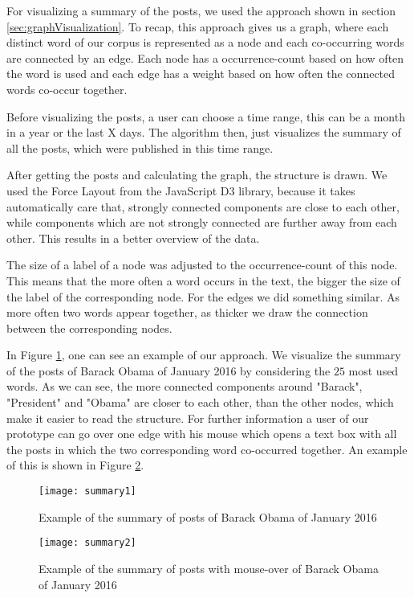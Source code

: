 For visualizing a summary of the posts, we used the approach shown in section \ref{sec:graphVisualization}. To recap, this approach gives us a graph, where each distinct word of our corpus is represented as a node and each co-occurring words are connected by an edge. Each node has a occurrence-count based on how often the word is used and each edge has a weight based on how often the connected words co-occur together.


Before visualizing the posts, a user can choose a time range, this can be a month in a year or the last X days. The algorithm then, just visualizes the summary of all the posts, which were published in this time range.


After getting the posts and calculating the graph, the structure is drawn. We used the Force Layout from the JavaScript D3 library, because it takes automatically care that, strongly connected components are close to each other, while components which are not strongly connected are further away from each other. This results in a better overview of the data. 


The size of a label of a node was adjusted to the occurrence-count of this node. This means that the more often a word occurs in the text, the bigger the size of the label of the corresponding node. For the edges we did something similar. As more often two words appear together, as thicker we draw the connection between the corresponding nodes.


In  Figure \ref{fig:summary}, one can see an example of our approach. We visualize the summary of the posts of Barack Obama of January 2016 by considering the $25$ most used words. As we can see, the more connected components around "Barack", "President" and "Obama" are closer to each other, than the other nodes, which make it easier to read the structure. For further information a user of our prototype can go over one edge with his mouse which opens a text box with all the posts in which the two corresponding word co-occurred together. An example of this is shown in Figure \ref{fig:summary2}.

\begin{figure}[t]
	\centering
	\texttt{[image: summary1]}
	\caption{Example of the summary of posts of Barack Obama of January 2016}
	\label{fig:summary}
\end{figure}


\begin{figure}[t]
	\centering
	\texttt{[image: summary2]}
	\caption{Example of the summary of posts with mouse-over of Barack Obama of January 2016}
	\label{fig:summary2}
\end{figure}


